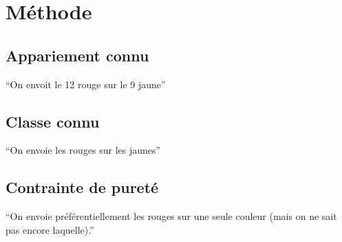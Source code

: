 

\chapter{Méthode}

\section{Appariement connu} %
\label{sec:appariement_connu}
``On envoit le 12 rouge sur le 9 jaune''


\section{Classe connu} %
\label{sec:classe_connu}
``On envoie les rouges sur les jaunes''


\section{Contrainte de pureté} %
\label{sec:contrainte_de_purete}
``On envoie préférentiellement les rouges sur une seule couleur (mais on ne sait pas encore laquelle).''





